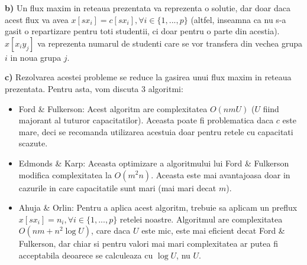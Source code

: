 \documentclass{article}
\begin{document}
{\bf b)} Un flux maxim in reteaua prezentata va reprezenta o solutie, dar doar daca acest flux va avea $x[sx_i] = c[sx_i], \forall i \in \{1,...,p\}$ (altfel, inseamna ca nu s-a gasit o repartizare pentru toti studentii, ci doar pentru o parte din acestia). $x[x_iy_j]$ va reprezenta numarul de studenti care se vor transfera din vechea grupa $i$ in noua grupa $j$.

{\bf c)} Rezolvarea acestei probleme se reduce la gasirea unui flux maxim in reteaua prezentata. Pentru asta, vom discuta 3 algoritmi:
\begin{itemize}
    \item Ford \& Fulkerson: Acest algoritm are complexitatea $O(nmU)$ ($U$ fiind majorant al tuturor capacitatilor). Aceasta poate fi problematica daca $c$ este mare, deci se recomanda utilizarea acestuia doar pentru retele cu capacitati scazute.
    \item Edmonds \& Karp: Aceasta optimizare a algoritmului lui Ford \& Fulkerson modifica complexitatea la $O(m^2n)$. Aceasta este mai avantajoasa doar in cazurile in care capacitatile sunt mari (mai mari decat $m$).
    \item Ahuja \& Orlin: Pentru a aplica acest algoritm, trebuie sa aplicam un preflux $x[sx_i] = n_i, \forall i \in \{1,...,p\}$ retelei noastre. Algoritmul are complexitatea $O(nm + n^2\log{U})$, care daca $U$ este mic, este mai eficient decat Ford \& Fulkerson, dar chiar si pentru valori mai mari complexitatea ar putea fi acceptabila deoarece se calculeaza cu $\log{U}$, nu $U$.
\end{itemize}
\end{document}
